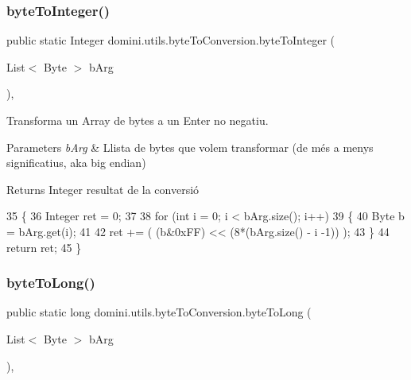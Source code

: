 \subsubsection{\texorpdfstring{byte\+To\+Integer()}{byteToInteger()}}
{\footnotesize\ttfamily public static Integer domini.\+utils.\+byte\+To\+Conversion.\+byte\+To\+Integer (\begin{DoxyParamCaption}\item[{List$<$ Byte $>$}]{b\+Arg }\end{DoxyParamCaption})\hspace{0.3cm}{\ttfamily [inline]}, {\ttfamily [static]}}



Transforma un Array de bytes a un Enter no negatiu. 


\begin{DoxyParams}{Parameters}
{\em b\+Arg} & Llista de bytes que volem transformar (de més a menys significatius, aka big endian) \\
\hline
\end{DoxyParams}
\begin{DoxyReturn}{Returns}
Integer resultat de la conversió 
\end{DoxyReturn}

\begin{DoxyCode}
35     \{
36         Integer ret = 0;
37 
38         \textcolor{keywordflow}{for} (\textcolor{keywordtype}{int} i = 0; i < bArg.size(); i++)
39         \{
40             Byte b = bArg.get(i);
41             
42             ret += ( (b&0xFF) << (8*(bArg.size() - i -1)) );
43         \}
44         \textcolor{keywordflow}{return} ret;
45     \}
\end{DoxyCode}
\mbox{\label{classdomini_1_1utils_1_1byteToConversion_a18600284c32cae9284c16c6396425d5a}} 
\subsubsection{\texorpdfstring{byte\+To\+Long()}{byteToLong()}}
{\footnotesize\ttfamily public static long domini.\+utils.\+byte\+To\+Conversion.\+byte\+To\+Long (\begin{DoxyParamCaption}\item[{List$<$ Byte $>$}]{b\+Arg }\end{DoxyParamCaption})\hspace{0.3cm}{\ttfamily [inline]}, {\ttfamily [static]}}



